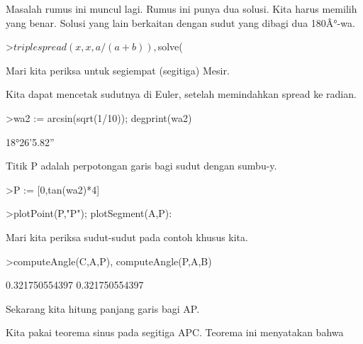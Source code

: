 \documentclass[a4paper,10pt]{article}
\begin{document}
\begin{eulernotebook}
\begin{eulercomment}
\begin{eulercomment}
\begin{eulercomment}
\begin{eulercomment}
\begin{eulercomment}
\begin{eulercomment}
\begin{eulercomment}
\begin{eulercomment}
\begin{eulercomment}
\begin{eulercomment}
\begin{eulercomment}
\begin{eulercomment}
\begin{eulercomment}
Masalah rumus ini muncul lagi. Rumus ini punya dua solusi. Kita harus memilih yang benar.
Solusi yang lain berkaitan dengan sudut yang dibagi dua 180Â°-wa.
\end{eulercomment}
\begin{eulerprompt}
>$triplespread(x,x,a/(a+b)), $solve(%
\end{eulerprompt}
\begin{eulercomment}
Mari kita periksa untuk segiempat (segitiga) Mesir.
\end{eulercomment}
\begin{eulercomment}
Kita dapat mencetak sudutnya di Euler, setelah memindahkan spread ke radian.
\end{eulercomment}
\begin{eulerprompt}
>wa2 := arcsin(sqrt(1/10)); degprint(wa2)
\end{eulerprompt}
\begin{euleroutput}
  18°26'5.82''
\end{euleroutput}
\begin{eulercomment}
Titik P adalah perpotongan garis bagi sudut dengan sumbu-y.
\end{eulercomment}
\begin{eulerprompt}
>P := [0,tan(wa2)*4]
\end{eulerprompt}
\begin{euleroutput}
  [0,  1.33333]
\end{euleroutput}
\begin{eulerprompt}
>plotPoint(P,"P"); plotSegment(A,P):
\end{eulerprompt}
\begin{eulercomment}
Mari kita periksa sudut-sudut pada contoh khusus kita.
\end{eulercomment}
\begin{eulerprompt}
>computeAngle(C,A,P), computeAngle(P,A,B)
\end{eulerprompt}
\begin{euleroutput}
  0.321750554397
  0.321750554397
\end{euleroutput}
\begin{eulercomment}
Sekarang kita hitung panjang garis bagi AP.

Kita pakai teorema sinus pada segitiga APC. Teorema ini menyatakan bahwa


\end{eulercomment}
\end{eulercomment}
\end{eulercomment}
\end{eulercomment}
\end{eulercomment}
\end{eulercomment}
\end{eulercomment}
\end{eulercomment}
\end{eulercomment}
\end{eulercomment}
\end{eulercomment}
\end{eulercomment}
\end{eulercomment}
\end{eulernotebook}
\end{document}

